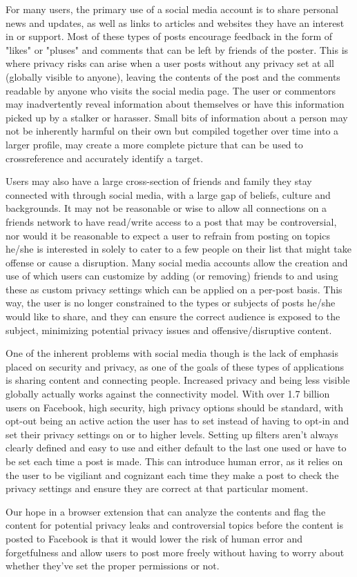 \blindtext
For many users, the primary use of a social media account is to share personal news and updates, as well as links to articles and websites they have an interest in or support. Most of these types of posts encourage feedback in the form of "likes" or "pluses" and comments that can be left by friends of the poster. This is where privacy risks can arise when a user posts without any privacy set at all (globally visible to anyone), leaving the contents of the post and the comments readable by anyone who visits the social media page. The user or commentors may inadvertently reveal information about themselves or have this information picked up by a stalker or harasser. Small bits of information about a person may not be inherently harmful on their own but compiled together over time into a larger profile, may create a more complete picture that can be used to crossreference and accurately identify a target.\cite{ghazinour2016yourprivacyprotector} 

Users may also have a large cross-section of friends and family they stay connected with through social media, with a large gap of beliefs, culture and backgrounds. It may not be reasonable or wise to allow all connections on a friends network to have read/write access to a post that may be controversial, nor would it be reasonable to expect a user to refrain from posting on topics he/she is interested in solely to cater to a few people on their list that might take offense or cause a disruption. Many social media accounts allow the creation and use of  which users can customize by adding (or removing) friends to and using these as custom privacy settings which can be applied on a per-post basis. This way, the user is no longer constrained to the types or subjects of posts he/she would like to share, and they can ensure the correct audience is exposed to the subject, minimizing potential privacy issues and offensive/disruptive content.

One of the inherent problems with social media though is the lack of emphasis placed on security and privacy, as one of the goals of these types of applications is sharing content and connecting people. Increased privacy and being less visible globally actually works against the connectivity model. With over 1.7 billion users on Facebook\cite{statista}, high security, high privacy options should be standard, with opt-out being an active action the user has to set instead of having to opt-in and set their privacy settings on or to higher levels. Setting up filters aren't always clearly defined and easy to use and either default to the last one used or have to be set each time a post is made. This can introduce human error, as it relies on the user to be vigiliant and cognizant each time they make a post to check the privacy settings and ensure they are correct at that particular moment. 

Our hope in a browser extension that can analyze the contents and flag the content for potential privacy leaks and controversial topics before the content is posted to Facebook is that it would lower the risk of human error and forgetfulness and allow users to post more freely without having to worry about whether they've set the proper permissions or not. 



